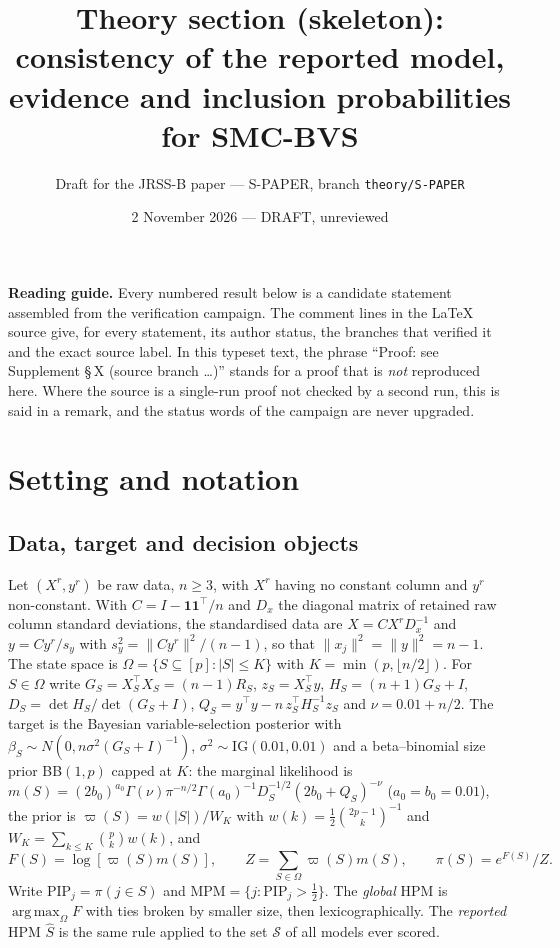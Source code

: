 \documentclass[11pt]{article}
\title{Theory section (skeleton): consistency of the reported model, evidence and inclusion probabilities
for SMC-BVS}
\author{Draft for the JRSS-B paper --- S-PAPER, branch \texttt{theory/S-PAPER}}
\date{2 November 2026 --- DRAFT, unreviewed}
\theoremstyle{definition}
\theoremstyle{remark}
\newcommand{\Sh}{\widehat S}
\newcommand{\PIP}{\mathrm{PIP}}
\newcommand{\MPM}{\mathrm{MPM}}
\newcommand{\cS}{\mathcal S}
\DeclareMathOperator*{\argmax}{arg\,max}
\begin{document}
\maketitle

\noindent\textbf{Reading guide.} Every numbered result below is a candidate statement assembled from the
verification campaign. The comment lines in the \LaTeX{} source give, for every statement, its author status, the
branches that verified it and the exact source label. In this typeset text, the phrase ``Proof: see Supplement
\S\,X (source branch \dots)'' stands for a proof that is \emph{not} reproduced here. Where the source is a
single-run proof not checked by a second run, this is said in a remark, and the status words of the campaign are
never upgraded.

\section{Setting and notation}\label{sec:setting}

\subsection{Data, target and decision objects}

Let $(X^r,y^r)$ be raw data, $n\ge 3$, with $X^r$ having no constant column and $y^r$ non-constant. With
$C=I-\mathbf 1\mathbf 1^\top/n$ and $D_x$ the diagonal matrix of retained raw column standard deviations, the
standardised data are $X=CX^rD_x^{-1}$ and $y=Cy^r/s_y$ with $s_y^2=\|Cy^r\|^2/(n-1)$, so that
$\|x_j\|^2=\|y\|^2=n-1$. The state space is $\Omega=\{S\subseteq[p]:|S|\le K\}$ with $K=\min(p,\lfloor n/2\rfloor)$.
For $S\in\Omega$ write $G_S=X_S^\top X_S=(n-1)R_S$, $z_S=X_S^\top y$, $H_S=(n+1)G_S+I$, $D_S=\det H_S/\det(G_S+I)$,
$Q_S=y^\top y-n\,z_S^\top H_S^{-1}z_S$ and $\nu=0.01+n/2$. The target is the Bayesian variable-selection posterior with
$\beta_S\sim N(0,n\sigma^2(G_S+I)^{-1})$, $\sigma^2\sim\mathrm{IG}(0.01,0.01)$ and a beta--binomial size prior
BB$(1,p)$ capped at $K$: the marginal likelihood is
$m(S)=(2b_0)^{a_0}\Gamma(\nu)\pi^{-n/2}\Gamma(a_0)^{-1}D_S^{-1/2}(2b_0+Q_S)^{-\nu}$ ($a_0=b_0=0.01$), the prior is
$\varpi(S)=w(|S|)/W_K$ with $w(k)=\tfrac12\binom{2p-1}{k}^{-1}$ and $W_K=\sum_{k\le K}\binom pk w(k)$, and
\[
F(S)=\log[\varpi(S)m(S)],\qquad Z=\sum_{S\in\Omega}\varpi(S)m(S),\qquad \pi(S)=e^{F(S)}/Z .
\]
Write $\PIP_j=\pi(j\in S)$ and $\MPM=\{j:\PIP_j>\tfrac12\}$. The \emph{global} HPM is $\argmax_\Omega F$ with ties
broken by smaller size, then lexicographically. The \emph{reported} HPM $\Sh$ is the same rule applied to the set
$\cS$ of all models ever scored.
\end{document}
